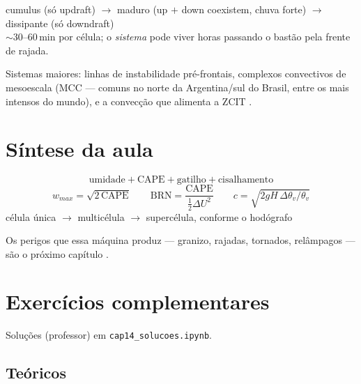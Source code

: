 \documentclass[11pt]{article}
\begin{document}
\begin{noquadro}
cumulus (só updraft) $\to$ maduro (up $+$ down coexistem, chuva forte)
$\to$ dissipante (só downdraft)\\[2pt]
$\sim$30--60\,min por célula; o \emph{sistema} pode viver horas
passando o bastão pela frente de rajada.
\end{noquadro}

Sistemas maiores: linhas de instabilidade pré-frontais, complexos
convectivos de mesoescala (MCC — comuns no norte da Argentina/sul do
Brasil, entre os mais intensos do mundo), e a convecção que alimenta a
ZCIT .

\section{Síntese da aula}

\begin{noquadro}
\[ \text{umidade} + \text{CAPE} + \text{gatilho} + \text{cisalhamento} \]
\[ w_{max} = \sqrt{2\,\mathrm{CAPE}} \qquad
\mathrm{BRN} = \frac{\mathrm{CAPE}}{\tfrac12\Delta U^2} \qquad
c = \sqrt{2gH\,\Delta\theta_v/\theta_v} \]
célula única $\to$ multicélula $\to$ supercélula, conforme o hodógrafo
\end{noquadro}

Os perigos que essa máquina produz — granizo, rajadas, tornados,
relâmpagos — são o próximo capítulo .

\section{Exercícios complementares}\label{sec:exercicios}

Soluções (professor) em \texttt{cap14\_solucoes.ipynb}.

\subsection*{Teóricos}
\end{document}
